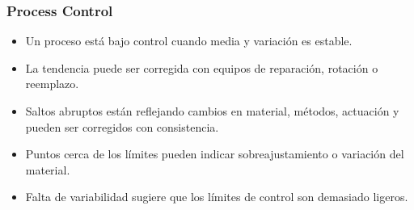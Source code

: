 \documentclass[]{article}
\begin{document}
\subsubsection{Process Control}
\begin{itemize}
	\item Un proceso está bajo control cuando media y variación es estable.
	\item La tendencia puede ser corregida con equipos de reparación, rotación o reemplazo.
	\item Saltos abruptos están reflejando cambios en material, métodos, actuación y pueden ser corregidos con consistencia.
	\item Puntos cerca de los límites pueden indicar sobreajustamiento o variación del material.
	\item Falta de variabilidad sugiere que los límites de control son demasiado ligeros.
\end{itemize}



\end{document}
